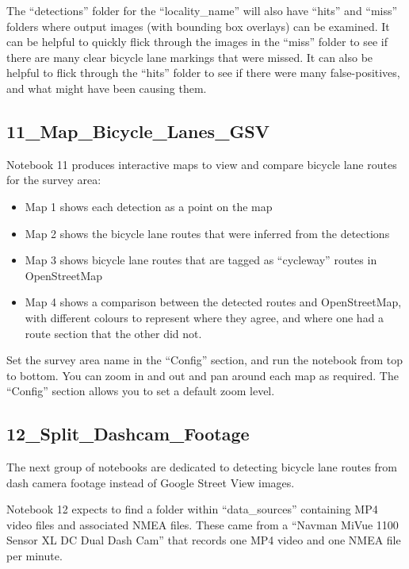 \documentclass[11pt,twoside]{report}
\begin{document}
The ``detections'' folder for the ``locality\_name'' will also have ``hits'' and ``miss'' folders where output images (with bounding box overlays) can be examined.  It can be helpful to quickly flick through the images in the ``miss'' folder to see if there are many clear bicycle lane markings that were missed.  It can also be helpful to flick through the ``hits'' folder to see if there were many false-positives, and what might have been causing them.


\subsection{11\_Map\_Bicycle\_Lanes\_GSV}
\label{a11}

Notebook 11 produces interactive maps to view and compare bicycle lane routes for the survey area:

\begin{itemize}
\item{Map 1 shows each detection as a point on the map}
\item{Map 2 shows the bicycle lane routes that were inferred from the detections}
\item{Map 3 shows bicycle lane routes that are tagged as ``cycleway'' routes in OpenStreetMap}
\item{Map 4 shows a comparison between the detected routes and OpenStreetMap, with different colours to represent where they agree, and where one had a route section that the other did not.}	
\end{itemize}

Set the survey area name in the ``Config'' section, and run the notebook from top to bottom.  You can zoom in and out and pan around each map as required.  The ``Config'' section allows you to set a default zoom level.


\subsection{12\_Split\_Dashcam\_Footage}
\label{a12}

The next group of notebooks are dedicated to detecting bicycle lane routes from dash camera footage instead of Google Street View images.

Notebook 12 expects to find a folder within ``data\_sources'' containing MP4 video files and associated NMEA files.  These came from a ``Navman MiVue 1100 Sensor XL DC Dual Dash Cam'' that records one MP4 video and one NMEA file per minute.
\end{document}

